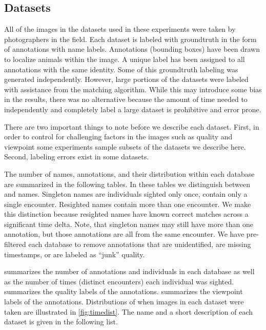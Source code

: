     \subsection{Datasets}\label{sub:datasets}

        All of the images in the datasets used in these experiments were taken by photographers in the field. Each
        dataset is labeled with groundtruth in the form of annotations with name labels. Annotations (bounding
        boxes) have been drawn to localize animals within the image. A unique \name{} label has been assigned to
        all annotations with the same identity. Some of this groundtruth labeling was generated independently.
        However, large portions of the datasets were labeled with assistance from the matching algorithm. While
        this may introduce some bias in the results, there was no alternative because the amount of time needed to
        independently and completely label a large dataset is prohibitive and error prone.

        There are two important things to note before we describe each dataset. First, in order to control for
        challenging factors in the images such as quality and viewpoint some experiments sample subsets of the
        datasets we describe here. Second, labeling errors exist in some datasets.

        \DatabaseInfo{}

        \timedist{}

        The number of names, annotations, and their distribution within each database are summarized in the
        following tables. In these tables we distinguish between  and 
        names. Singleton names are individuals sighted only once, \ie{} contain only a single encounter. Resighted
        names contain more than one encounter. We make this distinction because resighted names have known correct
        matches across a significant time delta. Note, that singleton names may still have more than one
        annotation, but those annotations are all from the same encounter. We have pre-filtered each database to
        remove annotations that are unidentified, are missing timestamps, or are labeled as ``junk'' quality.

         summarizes the number of annotations and individuals in each database as
          well as the number of times (distinct encounters) each individual was sighted.
         summarizes the quality labels of the annotations.
         summarizes the viewpoint labels of the annotations.
        Distributions of when images in each dataset were taken are illustrated in \cref{fig:timedist}.
        The name and a short description of each dataset is given in the following list.

